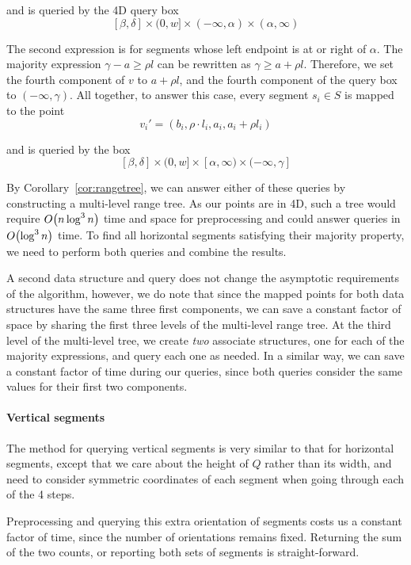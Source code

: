 \noindent and is queried by the 4D query box
\[
[\beta, \delta] \times (0, w] \times (-\infty, \alpha) \times (\alpha, \infty)
\]

The second expression is for segments whose left endpoint is at or right of $\alpha$. The majority expression $\gamma - a \geq \rho l$ can be rewritten as $\gamma \geq a + \rho l$. Therefore, we set the fourth component of $v$ to $a + \rho l$, and the fourth component of the query box to $(-\infty, \gamma)$.  All together, to answer this case, every segment $s_i \in S$ is mapped to the point
\[
v_i' = (b_i, \rho \cdot l_i, a_i, a_i + \rho l_i)
\]

\noindent and is queried by the box
\[
[\beta, \delta] \times (0, w] \times [\alpha, \infty) \times (-\infty, \gamma]
\]

By Corollary~\ref{cor:rangetree}, we can answer either of these queries by constructing a multi-level range tree.  As our points are in 4D, such a tree would require $O\!\left(n \log^3{n}\right)$ time and space for preprocessing and could answer queries in $O\!\left(\log^3{n}\right)$ time.  To find all horizontal segments satisfying their majority property, we need to perform both queries and combine the results.  

A second data structure and query does not change the asymptotic requirements of the algorithm, however, we do note that since the mapped points for both data structures have the same three first components, we can save a constant factor of space by sharing the first three levels of the multi-level range tree. At the third level of the multi-level tree, we create \emph{two} associate structures, one for each of the majority expressions, and query each one as needed. In a similar way, we can save a constant factor of time during our queries, since both queries consider the same values for their first two components.


\paragraph{Vertical segments}

The method for querying vertical segments is very similar to that for horizontal segments, except that we care about the height of $Q$ rather than its width, and need to consider symmetric coordinates of each segment when going through each of the 4 steps.

Preprocessing and querying this extra orientation of segments costs us a constant factor of time, since the number of orientations remains fixed.  Returning the sum of the two counts, or reporting both sets of segments is straight-forward.



